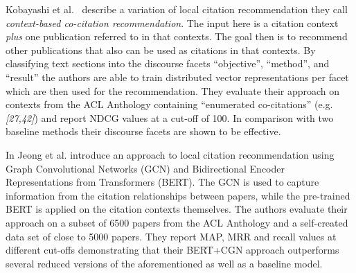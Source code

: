 Kobayashi et al.~\cite{Kobayashi2018} describe a variation of local citation recommendation they call \emph{context-based co-citation recommendation}. The input here is a citation context \emph{plus} one publication referred to in that contexts. The goal then is to recommend other publications that also can be used as citations in that contexts. By classifying text sections into the discourse facets ``objective'', ``method'', and ``result'' the authors are able to train distributed vector representations per facet which are then used for the recommendation. They evaluate their approach on contexts from the ACL Anthology containing ``enumerated co-citations'' (e.g. \emph{[27,42]}) and report NDCG values at a cut-off of 100. In comparison with two baseline methods their discourse facets are shown to be effective.

In \cite{Jeong2019} Jeong et al. introduce an approach to local citation recommendation using Graph Convolutional Networks (GCN) and Bidirectional Encoder Representations from Transformers (BERT). The GCN is used to capture information from the citation relationships between papers, while the pre-trained BERT is applied on the citation contexts themselves. The authors evaluate their approach on a subset of 6500 papers from the ACL Anthology and a self-created data set of close to 5000 papers. They report MAP, MRR and recall values at different cut-offs demonstrating that their BERT+CGN approach outperforms several reduced versions of the aforementioned as well as a baseline model.
